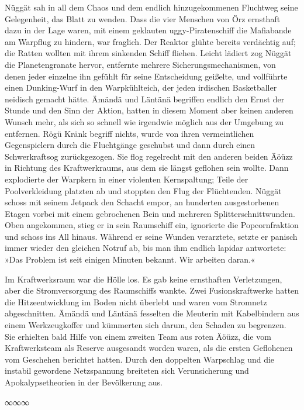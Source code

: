 Nüggät sah in all dem Chaos und dem endlich hinzugekommenen Fluchtweg seine Gelegenheit, das Blatt zu wenden. Dass die vier Menschen von Örz ernsthaft dazu in der Lage waren, mit einem geklauten uggy-Piratenschiff die Mafiabande am Warpflug zu hindern, war fraglich. Der Reaktor glühte bereits verdächtig auf; die Ratten wollten mit ihrem sinkenden Schiff fliehen. Leicht lädiert zog Nüggät die Planetengranate hervor, entfernte mehrere Sicherungsmechanismen, von denen jeder einzelne ihn gefühlt für seine Entscheidung geißelte, und vollführte einen Dunking-Wurf in den Warpkühlteich, der jeden irdischen Basketballer neidisch gemacht hätte. Ämändä und Läntänä begriffen endlich den Ernst der Stunde und den Sinn der Aktion, hatten in diesem Moment aber keinen anderen Wunsch mehr, als sich so schnell wie irgendwie möglich aus der Umgebung zu entfernen. Rögü Kränk begriff nichts, wurde von ihren vermeintlichen Gegenspielern durch die Fluchtgänge geschubst und dann durch einen Schwerkraftsog zurückgezogen. Sie flog regelrecht mit den anderen beiden Äöüzz in Richtung des Kraftwerkraums, aus dem sie längst geflohen sein wollte. Dann explodierte der Warpkern in einer violenten Kernspaltung; Teile der Poolverkleidung platzten ab und stoppten den Flug der Flüchtenden. Nüggät schoss mit seinem Jetpack den Schacht empor, an hunderten ausgestorbenen Etagen vorbei mit einem gebrochenen Bein und mehreren Splitterschnittwunden. Oben angekommen, stieg er in sein Raumschiff ein, ignorierte die Popcornfraktion und schoss ins All hinaus. Während er seine Wunden verarztete, setzte er panisch immer wieder den gleichen Notruf ab, bis man ihm endlich lapidar antwortete: »Das Problem ist seit einigen Minuten bekannt. Wir arbeiten daran.«

Im Kraftwerksraum war die Hölle los. Es gab keine ernsthaften Verletzungen, aber die Stromversorgung des Raumschiffs wankte. Zwei Fusionskraftwerke hatten die Hitzeentwicklung im Boden nicht überlebt und waren vom Stromnetz abgeschnitten. Ämändä und Läntänä fesselten die Meuterin mit Kabelbindern aus einem Werkzeugkoffer und kümmerten sich darum, den Schaden zu begrenzen. Sie erhielten bald Hilfe von einem zweiten Team aus roten Äöüzz, die vom Kraftwerksteam als Reserve ausgesandt worden waren, als die ersten Geflohenen vom Geschehen berichtet hatten. Durch den doppelten Warpschlag und die instabil gewordene Netzspannung breiteten sich Verunsicherung und Apokalypsetheorien in der Bevölkerung aus.

\begin{center}
	∞∞∞
\end{center}

